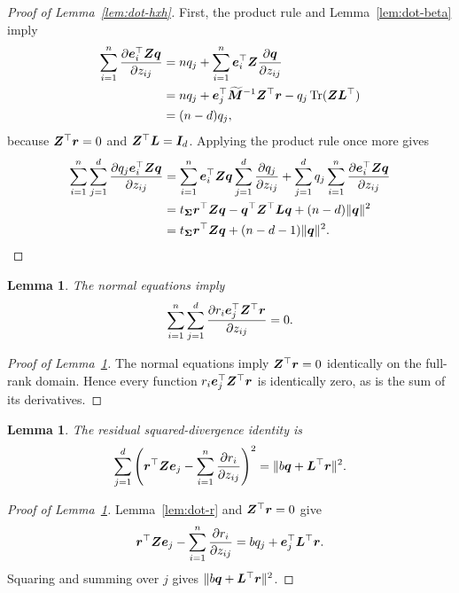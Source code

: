 \documentclass{article}
\theoremstyle{plain} %
\newtheorem{lemma}[theorem]{Lemma}
\theoremstyle{definition} %
\theoremstyle{definition} %
\begin{document}
\begin{proof}[Proof of Lemma~\ref{lem:dot-hxh}]
First, the product rule and Lemma~\ref{lem:dot-beta} imply
\begin{align*}
    \sum_{i=1}^n\pdv{\boldsymbol{e}_i^\top\boldsymbol{Z}\boldsymbol{q}}{z_{ij}}
    &=nq_j+\sum_{i=1}^n\boldsymbol{e}_i^\top\boldsymbol{Z}\pdv{\boldsymbol{q}}{z_{ij}}\\
    &=nq_j+\boldsymbol{e}_j^\top\widetilde{\boldsymbol{M}}^{-1}\boldsymbol{Z}^\top\boldsymbol{r}
       -q_j\operatorname{Tr}(\boldsymbol{Z}\boldsymbol{L}^\top)\\
    &=(n-d)q_j,
\end{align*}
because $\boldsymbol{Z}^\top\boldsymbol{r}=0$ and $\boldsymbol{Z}^\top\boldsymbol{L}=\boldsymbol{I}_d$.
Applying the product rule once more gives
\begin{align*}
    \sum_{i=1}^n\sum_{j=1}^d
       \pdv{q_j\boldsymbol{e}_i^\top\boldsymbol{Z}\boldsymbol{q}}{z_{ij}}
    &=\sum_{i=1}^n\boldsymbol{e}_i^\top\boldsymbol{Z}\boldsymbol{q}
       \sum_{j=1}^d\pdv{q_j}{z_{ij}}
       +\sum_{j=1}^d q_j
          \sum_{i=1}^n\pdv{\boldsymbol{e}_i^\top\boldsymbol{Z}\boldsymbol{q}}{z_{ij}}\\
    &=t_{\boldsymbol{\Sigma}}\boldsymbol{r}^\top\boldsymbol{Z}\boldsymbol{q}
       -\boldsymbol{q}^\top\boldsymbol{Z}^\top\boldsymbol{L}\boldsymbol{q}+(n-d)\lVert\boldsymbol{q}\rVert^2\\
    &=t_{\boldsymbol{\Sigma}}\boldsymbol{r}^\top\boldsymbol{Z}\boldsymbol{q}+(n-d-1)\lVert\boldsymbol{q}\rVert^2.
\end{align*}
\end{proof}

\begin{lemma}\label{lem:dot-rxr}
The normal equations imply
\begin{align*}
    \sum_{i=1}^n\sum_{j=1}^d
       \pdv{r_i\boldsymbol{e}_j^\top\boldsymbol{Z}^\top\boldsymbol{r}}{z_{ij}}=0.
\end{align*}
\end{lemma}

\begin{proof}[Proof of Lemma~\ref{lem:dot-rxr}]
The normal equations imply $\boldsymbol{Z}^\top\boldsymbol{r}=0$ identically on the full-rank
domain.  Hence every function $r_i\boldsymbol{e}_j^\top\boldsymbol{Z}^\top\boldsymbol{r}$ is identically
zero, as is the sum of its derivatives.
\end{proof}

\begin{lemma}\label{lem:dot-rxxr}
The residual squared-divergence identity is
\begin{align*}
    \sum_{j=1}^d\left(
       \boldsymbol{r}^\top\boldsymbol{Z}\boldsymbol{e}_j-\sum_{i=1}^n\pdv{r_i}{z_{ij}}
    \right)^2
    =\lVert b\boldsymbol{q}+\boldsymbol{L}^\top\boldsymbol{r}\rVert^2.
\end{align*}
\end{lemma}

\begin{proof}[Proof of Lemma~\ref{lem:dot-rxxr}]
Lemma~\ref{lem:dot-r} and $\boldsymbol{Z}^\top\boldsymbol{r}=0$ give
\begin{align*}
    \boldsymbol{r}^\top\boldsymbol{Z}\boldsymbol{e}_j-\sum_{i=1}^n\pdv{r_i}{z_{ij}}
    =bq_j+\boldsymbol{e}_j^\top\boldsymbol{L}^\top\boldsymbol{r}.
\end{align*}
Squaring and summing over $j$ gives $\lVert b\boldsymbol{q}+\boldsymbol{L}^\top\boldsymbol{r}\rVert^2$.
\end{proof}
\end{document}
